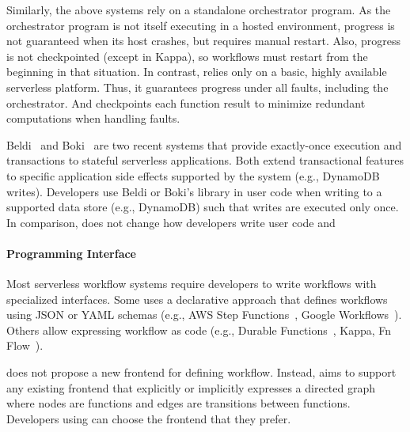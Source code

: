 Similarly, the above systems rely on a standalone orchestrator program. As
the orchestrator program is not itself executing in a hosted environment,
progress is not guaranteed when its host crashes, but requires manual restart.
Also, progress is not checkpointed (except in Kappa), so workflows must
restart from the beginning in that situation. In contrast, \name{} relies only
on a basic, highly available serverless platform. Thus, it guarantees progress
under all faults, including the orchestrator. And \name{} checkpoints each
function result to minimize redundant computations when handling faults.

Beldi~\cite{beldi} and Boki~\cite{boki} are two recent systems that provide
exactly-once execution and transactions to stateful serverless applications.
Both extend transactional features to specific application side effects
supported by the system (e.g., DynamoDB writes). Developers use Beldi or
Boki's library in user code when writing to a supported data store (e.g.,
DynamoDB) such that writes are executed only once. In comparison, \name{} does
not change how developers write user code and 

\paragraph{Programming Interface}

Most serverless workflow systems require developers to write workflows with
specialized interfaces. Some uses a declarative approach that defines
workflows using JSON or YAML schemas (e.g., AWS Step
Functions~\cite{aws-step-functions}, Google
Workflows~\cite{google-workflows}). Others allow expressing workflow as code
(e.g., Durable Functions~\cite{durable-functions}, Kappa\cite{kappa}, Fn
Flow~\cite{fn-flow}).

\name{} does not propose a new frontend for defining workflow. Instead,
\name{} aims to support any existing frontend that explicitly or implicitly
expresses a directed graph where nodes are functions and edges are transitions
between functions. Developers using \name{} can choose the frontend that they
prefer.



